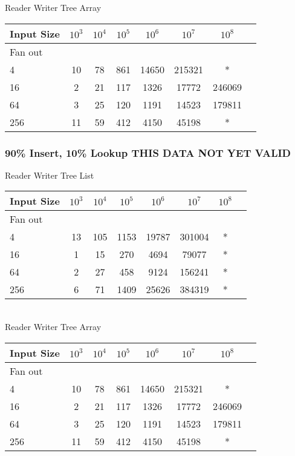 \documentclass{sig-alternate}
\begin{document}
Reader Writer Tree Array \\
\begin{tabular}{| l | c | c | c | c | c | c | r}
  \hline
  Input Size & $10^3$ & $10^4$ & $10^5$ & $10^6$ & $10^7$ & $10^8$ \\ \hline
  Fan out & & & & & &  \\  \hline
  4			&	10 & 78 & 861 & 14650 & 215321 & * \\
  16		&	2 & 21 & 117 & 1326 & 17772 & 246069 \\
  64		&	3 & 25 & 120 & 1191 & 14523 & 179811 \\
  256		&	11 & 59 & 412 & 4150 & 45198 & * \\
  \hline
\end{tabular} 

\subsubsection{90\% Insert, 10\% Lookup  THIS DATA NOT YET VALID}
Reader Writer Tree List \\
\begin{tabular}{| l | c | c | c | c | c | c | r}
  \hline
  Input Size & $10^3$ & $10^4$ & $10^5$ & $10^6$ & $10^7$ & $10^8$ \\ \hline
  Fan out & & & & & &  \\  \hline
  4			&	13 & 105 & 1153 & 19787 & 301004 & * \\
  16		&	1 & 15 & 270 & 4694 & 79077 & * \\
  64		&	2 & 27 & 458 & 9124 & 156241 & * \\
  256		&	6 & 71 & 1409 & 25626 & 384319 & * \\
  \hline
\end{tabular} \\

Reader Writer Tree Array \\
\begin{tabular}{| l | c | c | c | c | c | c | r}
  \hline
  Input Size & $10^3$ & $10^4$ & $10^5$ & $10^6$ & $10^7$ & $10^8$ \\ \hline
  Fan out & & & & & &  \\  \hline
  4			&	10 & 78 & 861 & 14650 & 215321 & * \\
  16		&	2 & 21 & 117 & 1326 & 17772 & 246069 \\
  64		&	3 & 25 & 120 & 1191 & 14523 & 179811 \\
  256		&	11 & 59 & 412 & 4150 & 45198 & * \\
  \hline
\end{tabular} 
\end{document}
